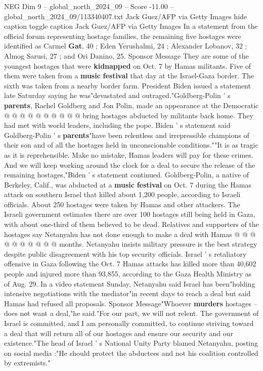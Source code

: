 \begin{textsample}{NEG Dim 9 – global\_north\_2024\_09 – Score -11.00 – global\_north\_2024\_09/113340407.txt}
Jack Guez/AFP via Getty Images hide caption toggle caption Jack Guez/AFP via Getty Images In a statement from the official forum representing hostage families, the remaining five hostages were identified as Carmel \textbf{Gat}, 40 ; Eden Yerushalmi, 24 ; Alexander Lobanov, 32 ; Almog Sarusi, 27 ; and Ori Danino, 25.
Sponsor Message They are some of the youngest hostages that were \textbf{kidnapped} on Oct. 7 by Hamas militants.
Five of them were taken from a \textbf{music} \textbf{festival} that day at the Israel-Gaza border.
The sixth was taken from a nearby border farm.
President Biden issued a statement late Saturday saying he was"devastated and outraged."Goldberg-Polin ' s \textbf{parents}, Rachel Goldberg and Jon Polin, made an appearance at the Democratic @ @ @ @ @ @ @ @ @ @ bring hostages abducted by militants back home.
They had met with world leaders, including the pope.
Biden ' s statement said Goldberg-Polin ' s \textbf{parents}"have been relentless and irrepressible champions of their son and of all the hostages held in unconscionable conditions.""It is as tragic as it is reprehensible.
Make no mistake, Hamas leaders will pay for these crimes.
And we will keep working around the clock for a deal to secure the release of the remaining hostages,"Biden ' s statement continued.
Goldberg-Polin, a native of Berkeley, Calif., was abducted at a \textbf{music} \textbf{festival} on Oct. 7 during the Hamas attack on southern Israel that killed about 1,200 people, according to Israeli officials.
About 250 hostages were taken by Hamas and other attackers.
The Israeli government estimates there are over 100 hostages still being held in Gaza, with about one-third of them believed to be dead.
Relatives and supporters of the hostages say Netanyahu has not done enough to make a deal with Hamas @ @ @ @ @ @ @ @ @ @ months.
Netanyahu insists military pressure is the best strategy despite public disagreement with his top security officials.
Israel ' s retaliatory offensive in Gaza following the Oct. 7 Hamas attacks has killed more than 40,602 people and injured more than 93,855, according to the Gaza Health Ministry as of Aug. 29.
In a video statement Sunday, Netanyahu said Israel has been"holding intensive negotiations with the mediator"in recent days to reach a deal but said Hamas had refused all proposals.
Sponsor Message"Whoever \textbf{murders} hostages -- does not want a deal,"he said."For our part, we will not relent.
The government of Israel is committed, and I am personally committed, to continue striving toward a deal that will return all of our hostages and ensure our security and our existence."The head of Israel ' s National Unity Party blamed Netanyahu, posting on social media :"He should protect the abductees and not his coalition controlled by extremists."

\end{textsample}
